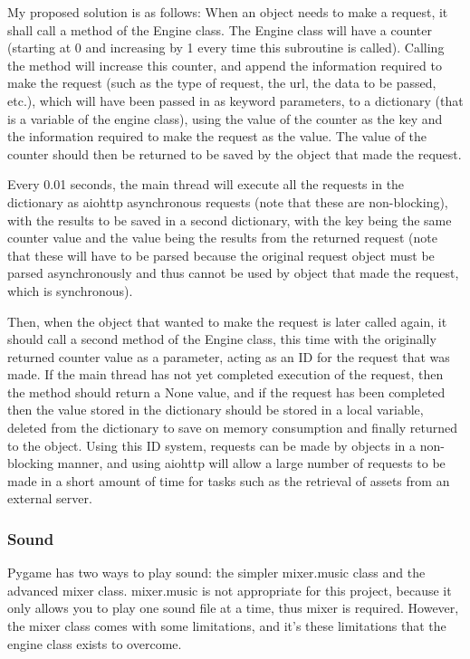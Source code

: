 \documentclass{report}
\begin{document}
My proposed solution is as follows: When an object needs to make a request, it shall call a method of the Engine class. The Engine class will have a counter (starting at 0 and increasing by 1 every time this subroutine is called). Calling the method will increase this counter, and append the information required to make the request (such as the type of request, the url, the data to be passed, etc.), which will have been passed in as keyword parameters, to a dictionary (that is a variable of the engine class), using the value of the counter as the key and the information required to make the request as the value. The value of the counter should then be returned to be saved by the object that made the request.

Every 0.01 seconds, the main thread will execute all the requests in the dictionary as aiohttp asynchronous requests (note that these are non-blocking), with the results to be saved in a second dictionary, with the key being the same counter value and the value being the results from the returned request (note that these will have to be parsed because the original request object must be parsed asynchronously and thus cannot be used by object that made the request, which is synchronous).  

Then, when the object that wanted to make the request is later called again, it should call a second method of the Engine class, this time with the originally returned counter value as a parameter, acting as an ID for the request that was made. If the main thread has not yet completed execution of the request, then the method should return a None value, and if the request has been completed then the value stored in the dictionary should be stored in a local variable, deleted from the dictionary to save on memory consumption and finally returned to the object. Using this ID system, requests can be made by objects in a non-blocking manner, and using aiohttp will allow a large number of requests to be made in a short amount of time for tasks such as the retrieval of assets from an external server.

\subsubsection{Sound}

Pygame has two ways to play sound: the simpler mixer.music class and the advanced mixer class. mixer.music is not appropriate for this project, because it only allows you to play one sound file at a time, thus mixer is required. However, the mixer class comes with some limitations, and it's these limitations that the engine class exists to overcome.
\end{document}
